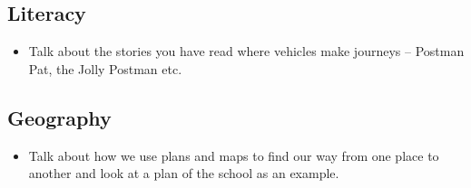 \documentclass{../../../lessonplan}
\begin{document}
\begin{lessonplan}
\subsection*{Literacy}

\begin{itemize}
\item Talk about the stories you have read where vehicles make journeys -- Postman Pat, the Jolly Postman etc.
\end{itemize}

\subsection*{Geography}

\begin{itemize}
\item Talk about how we use plans and maps to find our way from one place to another and look at a plan of the school as an example.
\end{itemize}

\end{lessonplan}
\end{document}

